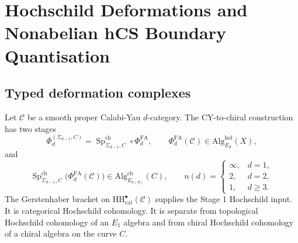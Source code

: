 \providecommand{\A}{\mathcal{A}}
\providecommand{\C}{\mathbb{C}}
\providecommand{\R}{\mathbb{R}}
\providecommand{\BV}{\mathrm{BV}}
\providecommand{\CE}{\mathrm{CE}}
\providecommand{\CoHA}{\operatorname{CoHA}}
\providecommand{\Def}{\mathrm{Def}}
\providecommand{\Ed}{E_d}
\providecommand{\Eone}{E_1}
\providecommand{\Etwo}{E_2}
\providecommand{\HH}{\mathrm{HH}}
\providecommand{\Obs}{\mathrm{Obs}}
\providecommand{\PV}{\mathrm{PV}}
\providecommand{\PhiFA}{\Phi^{\mathrm{FA}}}
\providecommand{\QME}{\mathrm{QME}}
\providecommand{\Rep}{\operatorname{Rep}}
\providecommand{\SpCh}{\operatorname{Sp}^{\mathrm{ch}}}
\providecommand{\Sym}{\operatorname{Sym}}
\providecommand{\Tr}{\operatorname{Tr}}
\providecommand{\Woneinf}{\mathcal{W}_{1+\infty}}
\providecommand{\Yp}{Y^{+}}
\providecommand{\Zchder}{Z^{\mathrm{der}}_{\mathrm{ch}}}
\providecommand{\cC}{\mathcal{C}}
\providecommand{\cE}{\mathcal{E}}
\providecommand{\cL}{\mathcal{L}}
\providecommand{\cO}{\mathcal{O}}
\providecommand{\dbar}{\bar\partial}
\providecommand{\fg}{\mathfrak{g}}
\providecommand{\fgl}{\mathfrak{gl}}
\providecommand{\hCS}{\mathrm{hCS}}
\providecommand{\klev}{k}
\providecommand{\sln}{\mathfrak{sl}_n}

\section{Hochschild Deformations and Nonabelian hCS Boundary Quantisation}
\label{sec:hochschild-nonabelian-hcs}

\subsection{Typed deformation complexes}

Let $\cC$ be a smooth proper Calabi-Yau $d$-category. The
CY-to-chiral construction has two stages
\[
  \Phi_d^{(\Sigma_{d-1},C)}
  =
  \SpCh_{\Sigma_{d-1},C}\circ \PhiFA_d,
  \qquad
  \PhiFA_d(\cC)\in \mathrm{Alg}_{\Ed}^{\mathrm{hol}}(X),
\]
and
\[
  \SpCh_{\Sigma_{d-1},C}\bigl(\PhiFA_d(\cC)\bigr)
  \in
  \mathrm{Alg}_{E_{n(d)}}^{\mathrm{ch}}(C),
  \qquad
  n(d)=
  \begin{cases}
    \infty, & d=1,\\
    2, & d=2,\\
    1, & d\geq 3.
  \end{cases}
\]
The Gerstenhaber bracket on $\HH^\bullet_{\mathrm{cat}}(\cC)$ supplies
the Stage 1 Hochschild input. It is categorical Hochschild cohomology.
It is separate from topological Hochschild cohomology of an $E_1$
algebra and from chiral Hochschild cohomology of a chiral algebra on
the curve $C$.

